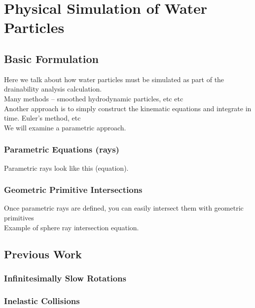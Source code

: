 						\chapter{Physical Simulation of Water Particles}

\section{Basic Formulation}

Here we talk about how water particles must be simulated as part of the drainability analysis calculation.
\\

Many methods -- smoothed hydrodynamic particles, etc etc
\\

Another approach is to simply construct the kinematic equations and integrate in time. Euler's method, etc
\\

We will examine a parametric approach.
\\

	\subsection{Parametric Equations (rays)}

Parametric rays look like this (equation).


	\subsection{Geometric Primitive Intersections}

Once parametric rays are defined, you can easily intersect them with geometric primitives
\\

Example of sphere ray intersection equation.




\section{Previous Work}

	\subsection{Infinitesimally Slow Rotations}

	\subsection{Inelastic Collisions}

